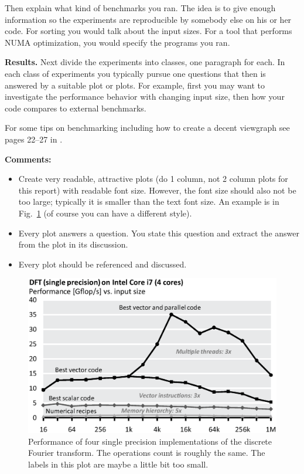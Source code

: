 \documentclass[letterpaper]{article}
\newcommand{\mypar}[1]{{\bf #1.}}
\theoremstyle{definition}
\begin{document}
Then explain what kind of benchmarks you ran. The idea is to give enough information so the experiments are reproducible by somebody else on his or her code.
For sorting you would talk about the input sizes. For a tool that performs NUMA optimization, you would specify the programs you ran.

\mypar{Results}
Next divide the experiments into classes, one paragraph for each. In each class of experiments you typically pursue one questions that then is answered by a suitable plot or plots. For example, first you may want to investigate the performance behavior with changing input size, then how your code compares to external benchmarks.

For some tips on benchmarking including how to create a decent viewgraph see pages 22--27 in \cite{Pueschel:10}.

{\bf Comments:}
\begin{itemize}
\item Create very readable, attractive plots (do 1 column, not 2 column plots
for this report) with readable font size. However, the font size should also not be too large; typically it is smaller than the text font size.
An example is in Fig.~\ref{fftperf} (of course you can have a different style).
\item Every plot answers a question. You state this question and extract the
answer from the plot in its discussion.
\item Every plot should be referenced and discussed.
\end{itemize}

\begin{figure}\centering
  \includegraphics[scale=0.33]{dft-performance.eps}
  \caption{Performance of four single precision implementations of the
  discrete Fourier transform. The operations count is roughly the
  same. The labels in this plot are maybe a little bit too small.\label{fftperf}}
\end{figure}
\end{document}
